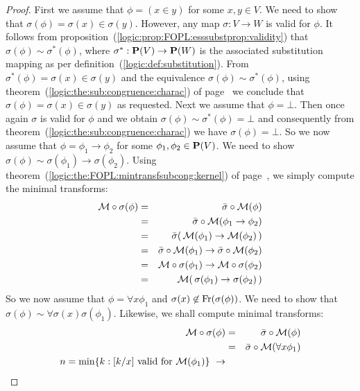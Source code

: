 \begin{proof}
First we assume that $\phi=(x\in y)$ for some $x,y\in V$. We need to
show that $\sigma(\phi)=\sigma(x)\in\sigma(y)$. However, any map
$\sigma:V\to W$ is valid for $\phi$. It follows from
proposition~(\ref{logic:prop:FOPL:esssubstprop:validity}) that
$\sigma(\phi)\sim\sigma^{*}(\phi)$, where $\sigma^{*}:\mbox{${\bf P}(V)$}\to{\bf
P}(W)$ is the associated substitution mapping as per
definition~(\ref{logic:def:substitution}). From
$\sigma^{*}(\phi)=\sigma(x)\in\sigma(y)$ and the equivalence
$\sigma(\phi)\sim\sigma^{*}(\phi)$, using
theorem~(\ref{logic:the:sub:congruence:charac}) of
page~\pageref{logic:the:sub:congruence:charac} we conclude that
$\sigma(\phi)=\sigma(x)\in\sigma(y)$ as requested. Next we assume
that $\phi=\bot$. Then once again $\sigma$ is valid for $\phi$ and
we obtain $\sigma(\phi)\sim\sigma^{*}(\phi)=\bot$ and consequently
from theorem~(\ref{logic:the:sub:congruence:charac}) we have
$\sigma(\phi)=\bot$. So we now assume that
$\phi=\phi_{1}\to\phi_{2}$ for some $\phi_{1},\phi_{2}\in\mbox{${\bf P}(V)$}$. We
need to show $\sigma(\phi)\sim\sigma(\phi_{1})\to\sigma(\phi_{2})$.
Using theorem~(\ref{logic:the:FOPL:mintransfsubcong:kernel}) of
page~\pageref{logic:the:FOPL:mintransfsubcong:kernel}, we simply
compute the minimal transforms:
    \begin{eqnarray*}
    {\cal M}\circ\sigma(\phi)&=&\bar{\sigma}\circ{\cal M}(\phi)\\
    &=&\bar{\sigma}\circ{\cal M}(\phi_{1}\to\phi_{2})\\
    &=&\bar{\sigma}(\,{\cal M}(\phi_{1})\to{\cal M}(\phi_{2})\,)\\
    &=&\bar{\sigma}\circ{\cal M}(\phi_{1})\to\bar{\sigma}\circ{\cal M}(\phi_{2})\\
    &=&{\cal M}\circ\sigma(\phi_{1})\to{\cal M}\circ\sigma(\phi_{2})\\
    &=&{\cal M}(\,\sigma(\phi_{1})\to\sigma(\phi_{2})\,)\\
    \end{eqnarray*}
So we now assume that $\phi=\forall x\phi_{1}$ and
$\sigma(x)\not\in\mbox{\rm Fr}(\sigma(\phi))$. We need to show that
$\sigma(\phi)\sim\forall\sigma(x)\sigma(\phi_{1})$. Likewise, we
shall compute minimal transforms:
    \begin{eqnarray*}
    {\cal M}\circ\sigma(\phi)&=&\bar{\sigma}\circ{\cal M}(\phi)\\
    &=&\bar{\sigma}\circ{\cal M}(\forall x\phi_{1})\\
    \mbox{$n=\min\{k:[k/x]\mbox{ valid for }{\cal M}(\phi_{1})\}$}\
    \rightarrow

\end{eqnarray*}
\end{proof}
